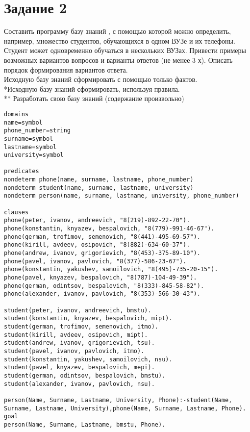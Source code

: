 \section{Задание 2}
Составить программу базу знаний , с помощью которой можно определить, например, множество студентов, обучающихся в одном ВУЗе и их телефоны. Студент может одновременно обучаться в нескольких ВУЗах. Привести примеры возможных вариантов вопросов и варианты ответов (не менее 3 х). Описать порядок формирования вариантов ответа.\\
Исходную базу знаний сформировать с помощью только фактов.\\
*Исходную базу знаний сформировать, используя правила.\\
** Разработать свою базу знаний (содержание произвольно)\\

\begin{lstlisting}
domains
name=symbol
phone_number=string
surname=symbol
lastname=symbol
university=symbol

predicates
nondeterm phone(name, surname, lastname, phone_number)
nondeterm student(name, surname, lastname, university)
nondeterm person(name, surname, lastname, university, phone_number)

clauses
phone(peter, ivanov, andreevich, "8(219)-892-22-70").
phone(konstantin, knyazev, bespalovich, "8(779)-991-46-67"). 
phone(german, trofimov, semenovich, "8(441)-495-69-57").     
phone(kirill, avdeev, osipovich, "8(882)-634-60-37").        
phone(andrew, ivanov, grigorievich, "8(453)-375-89-10").     
phone(pavel, ivanov, pavlovich, "8(377)-586-23-67").
phone(konstantin, yakushev, samoilovich, "8(495)-735-20-15").
phone(pavel, knyazev, bespalovich, "8(787)-104-49-39").      
phone(german, odintsov, bespalovich, "8(333)-845-58-82").    
phone(alexander, ivanov, pavlovich, "8(353)-566-30-43").
   
student(peter, ivanov, andreevich, bmstu).
student(konstantin, knyazev, bespalovich, mipt).
student(german, trofimov, semenovich, itmo).
student(kirill, avdeev, osipovich, mipt).
student(andrew, ivanov, grigorievich, tsu).
student(pavel, ivanov, pavlovich, itmo).
student(konstantin, yakushev, samoilovich, nsu).
student(pavel, knyazev, bespalovich, mepi).
student(german, odintsov, bespalovich, bmstu).
student(alexander, ivanov, pavlovich, nsu).

person(Name, Surname, Lastname, University, Phone):-student(Name, Surname, Lastname, University),phone(Name, Surname, Lastname, Phone).
goal	
person(Name, Surname, Lastname, bmstu, Phone).
\end{lstlisting}

